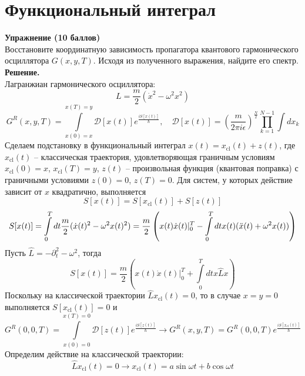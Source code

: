 \documentclass[12pt]{article}
\theoremstyle{definition}
\begin{document}
\section{Функциональный интеграл}
\textbf{Упражнение (10 баллов)}\\
Восстановите координатную зависимость пропагатора квантового гармонического осциллятора $G(x, y, T)$. Исходя из полученного выражения, найдите его спектр.\\
\textbf{Решение.}\\
Лагранжиан гармонического осциллятора:
\begin{equation}
    L=\frac{m}{2}(\dot{x}^{2}-\omega^{2}x^{2})
\end{equation}
\begin{equation}
    G^R(x,y,T)=\int\limits_{x(0)=x}^{x(T)=y}\mathcal{D}[x(t)]e^{\frac{iS[x(t)]}{\hbar}},\quad\mathcal{D}[x(t)]=\left(\frac{m}{2\pi i\epsilon}\right)^{\frac{N}{2}}\prod\limits_{k=1}^{N-1}\int dx_k
\end{equation}
Сделаем подстановку в функциональный интеграл $x(t)=x_\text{cl}(t)+z(t)$, где $x_\text{cl}(t)$ -- классическая траектория, удовлетворяющая граничным условиям $x_\text{cl}(0)=x$, $x_\text{cl}(T)=y$, $z(t)$ -- произвольная функция (квантовая поправка) с граничными условиями $z(0)=0$, $z(T)=0$. Для систем, у которых действие зависит от $x$ квадратично, выполняется
\begin{equation}
    S[x(t)]=S[x_\text{cl}(t)]+S[z(t)]
\end{equation}
\begin{equation}
    S[x(t)]=\int\limits_0^Tdt\frac{m}{2}(\dot{x}(t)^{2}-\omega^{2}x(t)^{2})=\frac{m}{2}\left(x(t)\dot{x}(t)|_0^T-\int\limits_0^Tdtx(t)(\Ddot{x}(t)+\omega^2x(t))\right)
\end{equation}
Пусть $\hat{L}=-\partial^2_t-\omega^2$, тогда
\begin{equation}
    S[x(t)]=\frac{m}{2}\left(x(t)\dot{x}(t)|_0^T+\int\limits_0^Tdtx\hat{L}x\right)
\end{equation}
Поскольку на классической траектории $\hat{L}x_\text{cl}(t)=0$, то в случае $x=y=0$ выполняется $S[x_\text{cl}(t)]=0$ и
\begin{equation}
    G^R(0,0,T)=\int\limits_{x(0)=0}^{x(T)=0}\mathcal{D}[z(t)]e^{\frac{iS[z(t)]}{\hbar}}\rightarrow G^R(x,y,T)=G^R(0,0,T)e^{\frac{iS[x_\text{cl}(t)]}{\hbar}}
\end{equation}
Определим действие на классической траектории:
\begin{equation}
    \hat{L}x_\text{cl}(t)=0\rightarrow x_\text{cl}(t)=a\sin\omega t+b\cos\omega t
\end{equation}
\end{document}
